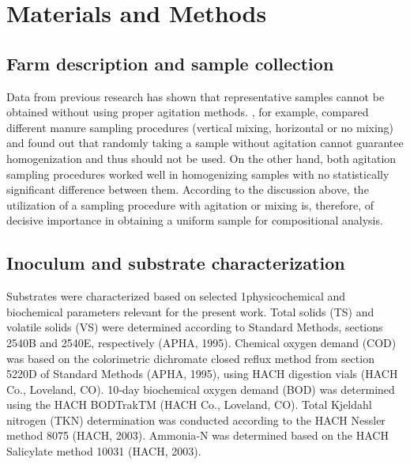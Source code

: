 \section{Materials and Methods}
\subsection{Farm description and sample collection}
Data from previous research has shown that representative samples cannot be obtained without using proper agitation methods. \cite{Zhu_2004}, for example, compared different manure sampling procedures (vertical mixing, horizontal or no mixing) and found out that randomly taking a sample without agitation cannot guarantee homogenization and thus should not be used. On the other hand, both agitation sampling procedures worked well in homogenizing samples with no statistically significant difference between them.  According to the discussion above, the utilization of a sampling procedure with agitation or mixing is, therefore, of decisive importance in obtaining a uniform sample for compositional analysis.
\subsection{Inoculum and substrate characterization}
Substrates were characterized based on selected 1physicochemical and biochemical parameters relevant for the present work. Total solids (TS) and volatile solids (VS) were determined according to Standard Methods, sections 2540B and 2540E, respectively (APHA, 1995). Chemical oxygen demand (COD) was based on the colorimetric dichromate closed reflux method from section 5220D of Standard Methods (APHA, 1995), using HACH digestion vials (HACH Co., Loveland, CO). 10‐day biochemical oxygen demand (BOD) was determined using the HACH BODTrakTM (HACH Co., Loveland, CO). Total Kjeldahl nitrogen (TKN) determination was conducted according to the HACH Nessler method 8075 (HACH, 2003). Ammonia‐N was determined based on the HACH Salicylate method 10031 (HACH, 2003). 

